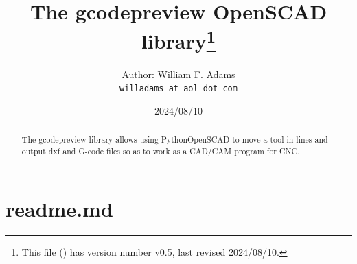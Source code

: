 \documentclass{ltxdoc}
\begin{document}

\def\fileversion{v0.5} \def\filedate{2024/08/10}




\title{The gcodepreview OpenSCAD library\thanks{This
        file (\texttt{\jobname}) has version number \fileversion, last revised
        \filedate.}}

\author{%
Author: William F. Adams\\
\texttt{willadams at aol dot com}
}
\date{\filedate}
\maketitle
\begin{abstract}
\noindent The gcodepreview library allows using PythonOpenSCAD to move a tool in lines 
and output dxf and G-code files so as to work as a CAD/\allowbreak CAM program for CNC.
\end{abstract}
\tableofcontents

\clearpage
\section{readme.md}
\end{document}

